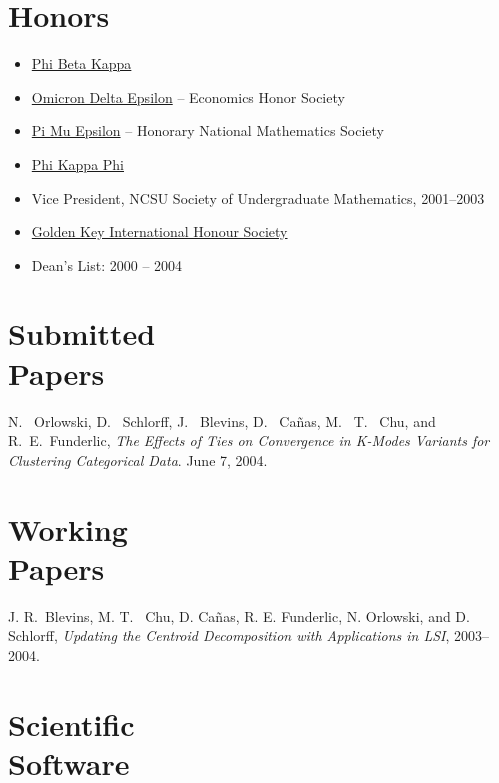 \documentclass[margin,line,11pt,final]{res}
\begin{document}
\begin{resume}
\section{\sc Honors}
\begin{itemize}
\item \href{http://www.pbk.org/}{Phi Beta Kappa}
\item \href{http://www.cba.ua.edu/~ode/}
  {Omicron Delta Epsilon} -- Economics Honor Society
\item \href{http://www.pme-math.org/}
  {Pi Mu Epsilon} -- Honorary National Mathematics Society
\item \href{http://www.phikappaphi.org/}{Phi Kappa Phi}
\item Vice President, NCSU Society of Undergraduate Mathematics, 2001--2003
\item \href{http://www.goldenkey.org}{Golden Key International Honour Society}
\item Dean's List: 2000 -- 2004
\end{itemize}


\section{\sc Submitted \\Papers}

N. \ Orlowski, D. \ Schlorff, J. \ Blevins, D. \ Ca\~{n}as, M. \ T. \
Chu, and R.\ E.\ Funderlic, {\em The Effects of Ties on Convergence in
  K-Modes Variants for Clustering Categorical Data}. June 7, 2004.


\section{\sc Working \\Papers}

J. R.\ Blevins, M. T. \ Chu, D. Ca\~{n}as, R. E. Funderlic, N.
Orlowski, and D. Schlorff, {\em Updating the Centroid Decomposition with
  Applications in LSI}, 2003--2004.


\section{\sc Scientific \\Software}


\end{resume}
\end{document}
